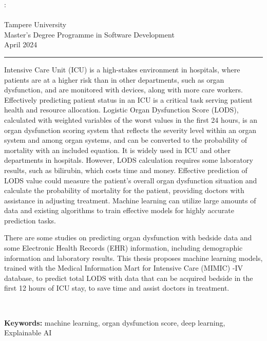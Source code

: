 \documentclass[12pt,a4paper,english
]{tunithesis}
\begin{document}
\begin{spacing}{1.0}
\noindent \@author: \@title\\
\@thesistype\\
Tampere University\\
Master’s Degree Programme in Software Development\\
April 2024
\end{spacing}
\noindent\rule{12cm}{0.4pt}

\vspace{0.5cm}


\noindent Intensive Care Unit (ICU) is a high-stakes environment in hospitals, where patients are at a higher risk than in other departments, such as organ dysfunction, and are monitored with devices, along with more care workers. Effectively predicting patient status in an ICU is a critical task serving patient health and resource allocation. Logistic Organ Dysfunction Score (LODS), calculated with weighted variables of the worst values in the first 24 hours, is an organ dysfunction scoring system that reflects the severity level within an organ system and among organ systems, and can be converted to the probability of mortality with an included equation. It is widely used in ICU and other departments in hospitals. However, LODS calculation requires some laboratory results, such as bilirubin, which costs time and money. Effective prediction of LODS value could measure the patient's overall organ dysfunction situation and calculate the probability of mortality for the patient, providing doctors with assistance in adjusting treatment. Machine learning can utilize large amounts of data and existing algorithms to train effective models for highly accurate prediction tasks.

\noindent There are some studies on predicting organ dysfunction with bedside data and some Electronic Health Records (EHR) information, including demographic information and laboratory results. This thesis proposes machine learning models, trained with the Medical Information Mart for Intensive Care (MIMIC) -IV database, to predict total LODS with data that can be acquired bedside in the first 12 hours of ICU stay, to save time and assist doctors in treatment. 




~

\noindent\textbf{Keywords:} machine learning, organ dysfunction score, deep learning, Explainable AI
\end{document}
